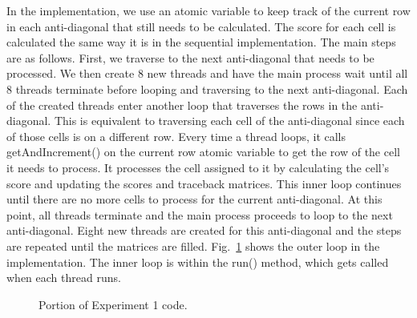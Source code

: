 \documentclass[conference]{IEEEtran}
\begin{document}
In the implementation, we use an atomic variable to keep track of the current row in each anti-diagonal that still needs to be calculated. The score for each cell is calculated the same way it is in the sequential implementation. The main steps are as follows. First, we traverse to the next anti-diagonal that needs to be processed. We then create 8 new threads and have the main process wait until all 8 threads terminate before looping and traversing to the next anti-diagonal. Each of the created threads enter another loop that traverses the rows in the anti-diagonal. This is equivalent to traversing each cell of the anti-diagonal since each of those cells is on a different row. Every time a thread loops, it calls getAndIncrement() on the current row atomic variable to get the row of the cell it needs to process. It processes the cell assigned to it by calculating the cell's score and updating the scores and traceback matrices. This inner loop continues until there are no more cells to process for the current anti-diagonal. At this point, all threads terminate and the main process proceeds to loop to the next anti-diagonal. Eight new threads are created for this anti-diagonal and the steps are repeated until the matrices are filled. Fig.~\ref{12} shows the outer loop in the implementation. The inner loop is within the run() method, which gets called when each thread runs.

\begin{figure}[htbp]
\centerline{}
\caption{Portion of Experiment 1 code.}
\label{12}
\end{figure}
\end{document}
